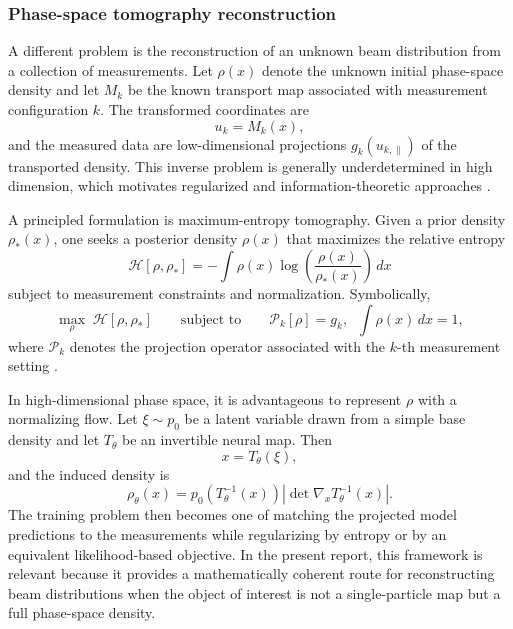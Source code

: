 \documentclass[11pt,a4paper]{article}
\begin{document}
\begin{sloppypar}
\subsubsection{Phase-space tomography reconstruction}

A different problem is the reconstruction of an unknown beam distribution from a collection of measurements. Let $\rho(x)$ denote the unknown initial phase-space density and let $M_k$ be the known transport map associated with measurement configuration $k$. The transformed coordinates are
\begin{equation}
u_k = M_k(x),
\end{equation}
and the measured data are low-dimensional projections $g_k(u_{k,\parallel})$ of the transported density. This inverse problem is generally underdetermined in high dimension, which motivates regularized and information-theoretic approaches \cite{hoover_high-dimensional_2024}.

A principled formulation is maximum-entropy tomography. Given a prior density $\rho_*(x)$, one seeks a posterior density $\rho(x)$ that maximizes the relative entropy
\begin{equation}
\mathcal H[\rho,\rho_*]
=
-\int \rho(x)\log\!\left(\frac{\rho(x)}{\rho_*(x)}\right)\,dx
\label{eq:relative_entropy}
\end{equation}
subject to measurement constraints and normalization. Symbolically,
\begin{equation}
\max_{\rho}\; \mathcal H[\rho,\rho_*]
\qquad
\text{subject to}
\qquad
\mathcal P_k[\rho]=g_k,\;\;
\int \rho(x)\,dx=1,
\label{eq:ment_problem}
\end{equation}
where $\mathcal P_k$ denotes the projection operator associated with the $k$-th measurement setting \cite{hoover_high-dimensional_2024}.

In high-dimensional phase space, it is advantageous to represent $\rho$ with a normalizing flow. Let $\xi\sim p_0$ be a latent variable drawn from a simple base density and let $T_{\theta}$ be an invertible neural map. Then
\begin{equation}
x = T_{\theta}(\xi),
\end{equation}
and the induced density is
\begin{equation}
\rho_{\theta}(x)
=
p_0\!\left(T_{\theta}^{-1}(x)\right)
\left|
\det \nabla_x T_{\theta}^{-1}(x)
\right|.
\label{eq:flow_density}
\end{equation}
The training problem then becomes one of matching the projected model predictions to the measurements while regularizing by entropy or by an equivalent likelihood-based objective. In the present report, this framework is relevant because it provides a mathematically coherent route for reconstructing beam distributions when the object of interest is not a single-particle map but a full phase-space density. 


\end{sloppypar}
\end{document}
